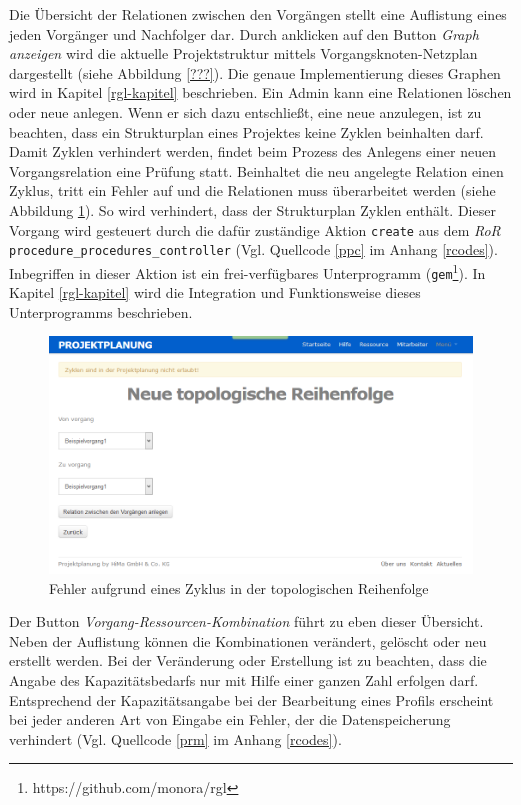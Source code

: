 \documentclass[a4paper,12pt,parskip,bibtotoc,liststotoc]{article}
\begin{document}
Die Übersicht der Relationen zwischen den Vorgängen stellt eine Auflistung eines jeden Vorgänger und Nachfolger dar. Durch anklicken auf den Button \textit{Graph anzeigen} wird die aktuelle Projektstruktur mittels Vorgangsknoten-Netzplan dargestellt (siehe Abbildung \ref{???}). Die genaue Implementierung dieses Graphen wird in Kapitel \ref{rgl-kapitel} beschrieben. Ein Admin kann eine Relationen löschen oder neue anlegen. Wenn er sich dazu entschließt, eine neue anzulegen, ist zu beachten, dass ein Strukturplan eines Projektes keine Zyklen beinhalten darf. Damit Zyklen verhindert werden, findet beim Prozess des Anlegens einer neuen Vorgangsrelation eine Prüfung statt. Beinhaltet die neu angelegte Relation einen Zyklus, tritt ein Fehler auf und die Relationen muss überarbeitet werden (siehe Abbildung \ref{VorErr}). So wird verhindert, dass der Strukturplan Zyklen enthält. Dieser Vorgang wird gesteuert durch die dafür zuständige Aktion \texttt{create} aus dem \textit{RoR} \texttt{procedure\_procedures\_controller} (Vgl. Quellcode \ref{ppc} im Anhang \ref{rcodes}). Inbegriffen in dieser Aktion ist ein frei-verfügbares Unterprogramm (\texttt{gem}\footnote{https://github.com/monora/rgl}). In Kapitel \ref{rgl-kapitel} wird die Integration und Funktionsweise dieses Unterprogramms beschrieben. \\

\begin{figure}[h!]
  \begin{center}
    \includegraphics[width=120mm]{Bilder/Vorgangsrel_Fehler.png}
    \caption{Fehler aufgrund eines Zyklus in der topologischen Reihenfolge}  \label{VorErr}
  \end{center}
\end{figure}
 
Der Button \textit{Vorgang-Ressourcen-Kombination} führt zu eben dieser Übersicht. Neben der Auflistung können die Kombinationen verändert, gelöscht oder neu erstellt werden. Bei der Veränderung oder Erstellung ist zu beachten, dass die Angabe des Kapazitätsbedarfs nur mit Hilfe einer ganzen Zahl erfolgen darf. Entsprechend der Kapazitätsangabe bei der Bearbeitung eines Profils erscheint bei jeder anderen Art von Eingabe ein Fehler, der die Datenspeicherung verhindert (Vgl. Quellcode \ref{prm} im Anhang \ref{rcodes}).\\
\end{document}
